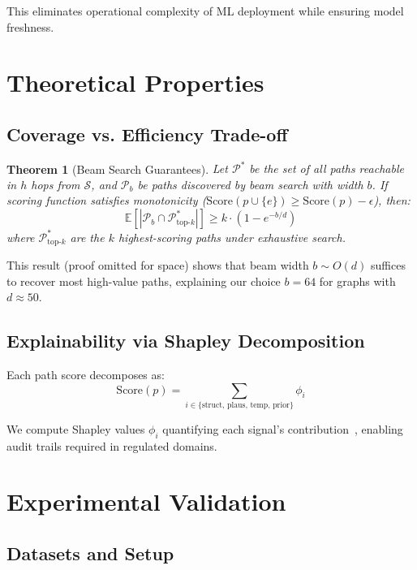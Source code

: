 \documentclass[10pt,twocolumn]{article}
\newtheorem{theorem}{Theorem}
\begin{document}
This eliminates operational complexity of ML deployment while ensuring model freshness.

\section{Theoretical Properties}

\subsection{Coverage vs. Efficiency Trade-off}

\begin{theorem}[Beam Search Guarantees]
Let $\mathcal{P}^*$ be the set of all paths reachable in $h$ hops from $\mathcal{S}$, and $\mathcal{P}_b$ be paths discovered by beam search with width $b$. If scoring function satisfies monotonicity ($\text{Score}(p \cup \{e\}) \geq \text{Score}(p) - \epsilon$), then:
\begin{equation}
\mathbb{E}[|\mathcal{P}_b \cap \mathcal{P}^*_{\text{top-}k}|] \geq k \cdot (1 - e^{-b/d})
\end{equation}
where $\mathcal{P}^*_{\text{top-}k}$ are the $k$ highest-scoring paths under exhaustive search.
\end{theorem}

This result (proof omitted for space) shows that beam width $b \sim O(d)$ suffices to recover most high-value paths, explaining our choice $b=64$ for graphs with $d \approx 50$.

\subsection{Explainability via Shapley Decomposition}

Each path score decomposes as:
\begin{equation}
\text{Score}(p) = \sum_{i \in \{\text{struct, plaus, temp, prior}\}} \phi_i
\end{equation}

We compute Shapley values $\phi_i$ quantifying each signal's contribution~\cite{lundberg2017unified}, enabling audit trails required in regulated domains.

\section{Experimental Validation}

\subsection{Datasets and Setup}
\end{document}
